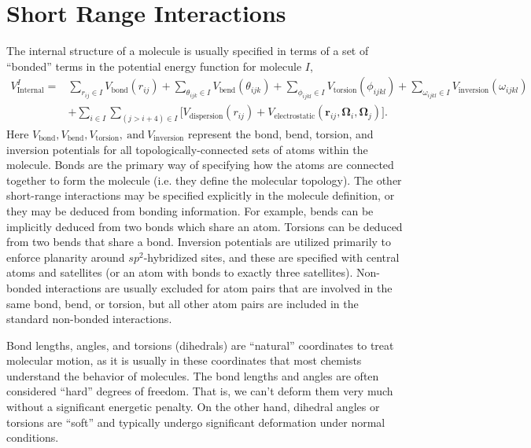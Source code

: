 \documentclass[]{book}
\begin{document}
\section{\label{section::ffShortRange}Short Range Interactions}
The internal structure of a molecule is usually specified in terms of
a set of ``bonded'' terms in the potential energy function for
molecule $I$,
\begin{align*}
 V^{I}_{\text{Internal}} =  &
 \sum_{r_{ij} \in I} V_{\text{bond}}(r_{ij})
 + \sum_{\theta_{ijk} \in I} V_{\text{bend}}(\theta_{ijk})
 + \sum_{\phi_{ijkl} \in I} V_{\text{torsion}}(\phi_{ijkl})
 + \sum_{\omega_{ijkl} \in I} V_{\text{inversion}}(\omega_{ijkl}) \\
 & + \sum_{i \in I} \sum_{(j>i+4) \in I} 
 \biggl[ V_{\text{dispersion}}(r_{ij}) +  V_{\text{electrostatic}}
 (\mathbf{r}_{ij},\boldsymbol{\Omega}_{i},\boldsymbol{\Omega}_{j})
 \biggr].
\label{eq:internalPotential}
\end{align*}
Here $V_{\text{bond}}, V_{\text{bend}},
V_{\text{torsion}},\mathrm{~and~} V_{\text{inversion}}$ represent the
bond, bend, torsion, and inversion potentials for all
topologically-connected sets of atoms within the molecule.  Bonds are
the primary way of specifying how the atoms are connected together to
form the molecule (i.e. they define the molecular topology).  The
other short-range interactions may be specified explicitly in the
molecule definition, or they may be deduced from bonding information.
For example, bends can be implicitly deduced from two bonds which
share an atom.  Torsions can be deduced from two bends that share a
bond.  Inversion potentials are utilized primarily to enforce
planarity around $sp^2$-hybridized sites, and these are specified with
central atoms and satellites (or an atom with bonds to exactly three
satellites). Non-bonded interactions are usually excluded for atom
pairs that are involved in the same bond, bend, or torsion, but all
other atom pairs are included in the standard non-bonded interactions.

Bond lengths, angles, and torsions (dihedrals) are ``natural''
coordinates to treat molecular motion, as it is usually in these
coordinates that most chemists understand the behavior of molecules.
The bond lengths and angles are often considered ``hard'' degrees of
freedom.  That is, we can't deform them very much without a
significant energetic penalty.  On the other hand, dihedral angles or
torsions are ``soft'' and typically undergo significant deformation
under normal conditions.
\end{document}
